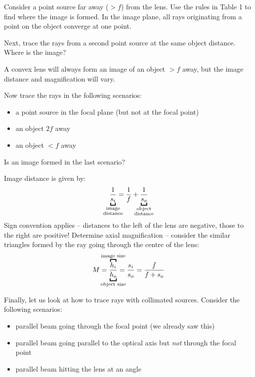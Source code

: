 \documentclass{article}
\newcommand{\nexercise}[0]{\arabic{exercises}\addtocounter{exercises}{1}}
\begin{document}
\begin{exercisebox}[frametitle={Exercise \nexercise: Image formation}]
Consider a point source far away ($>f$) from the lens. Use the rules in Table 1 to find where the image is formed. In the image plane, all rays originating from a point on the object converge at one point.

Next, trace the rays from a second point source at the same object distance. Where is the image?
\end{exercisebox}

A convex lens will always form an image of an object $>f$ away, but the image distance and magnification will vary.

\begin{exercisebox}[frametitle={Exercise \nexercise: Image formation}]
Now trace the rays in the following scenarios:
\begin{itemize}
	\item a point source in the focal plane (but not at the focal point)
	\item an object $2f$ away
	\item an object $<f$ away
\end{itemize}
Is an image formed in the last scenario?
\end{exercisebox}

Image distance is given by:
\begin{equation}
	\frac{1}{\underbracket{s_i}_{\mathclap{\substack{\text{image} \\ \text{distance}}}}} = 
	\frac{1}{f} + \frac{1}{\underbracket{s_o}_{\mathclap{\substack{\text{object} \\ \text{distance}}}}}
\end{equation}
Sign convention applies -- distances to the left of the lens are negative, those to the right are positive! Determine axial magnification -- consider the similar triangles formed by the ray going through the centre of the lens:
\begin{equation}
	M = \frac{\overbracket{h_i}^{\mathclap{\text{image size}}}}{\underbracket{h_o}_{\mathclap{\text{object size}}}} = \frac{s_i}{s_o} = \frac{f}{f + s_o}
\end{equation}

\begin{exercisebox}[frametitle={Exercise \nexercise: Ray tracing with collimated sources}]
Finally, let us look at how to trace rays with collimated sources. Consider the following scenarios:
\begin{itemize}
	\item parallel beam going through the focal point (we already saw this)
	\item parallel beam going parallel to the optical axis but \textit{not} through the focal point
	\item parallel beam hitting the lens at an angle
\end{itemize}
\end{exercisebox}
\end{document}
